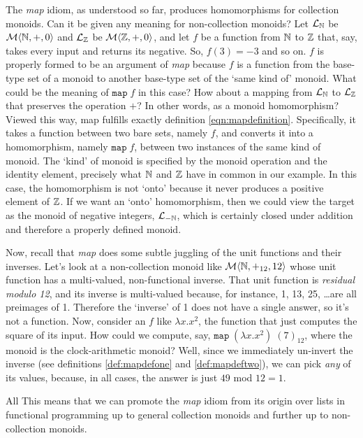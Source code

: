 The \emph{map} idiom, as understood so far, produces homomorphisms for collection monoids. Can it be given any meaning for non-collection monoids? Let $\mathcal{L}_{\mathbb{N}}$ be $\mathcal{M}\langle{\mathbb{N}},{+},{0}\rangle$ and $\mathcal{L}_{\mathbb{Z}}$ be $\mathcal{M}\langle{\mathbb{Z}},{+},{0}\rangle$, and let $f$ be a function from $\mathbb{N}$ to $\mathbb{Z}$ that, say, takes every input and returns its negative. So, $f(3)=-3$ and so on. $f$ is properly formed to be an argument of \emph{map} because $f$ is a function from the base-type set of a monoid to another base-type set of the `same kind of' monoid. What could be the meaning of $\mathtt{map}\;f$ in this case? How about a mapping from $\mathcal{L}_{\mathbb{N}}$ to $\mathcal{L}_{\mathbb{Z}}$ that preserves the operation $+$? In other words, as a monoid homomorphism? Viewed this way, map fulfills exactly definition \ref{eqn:mapdefinition}. Specifically, it takes a function between two bare sets, namely $f$, and converts it into a homomorphism, namely $\mathtt{map}\;f$, between two instances of the same kind of monoid. The `kind' of monoid is specified by the monoid operation and the identity element, precisely what $\mathbb{N}$ and $\mathbb{Z}$ have in common in our example. In this case, the homomorphism is not `onto' because it never produces a positive element of $\mathbb{Z}$. If we want an `onto' homomorphism, then we could view the target as the monoid of negative integers, $\mathcal{L}_{-\mathbb{N}}$, which is certainly closed under addition and therefore a properly defined monoid. 


Now, recall that \emph{map} does some subtle juggling of the unit functions and their inverses. Let's look at a non-collection monoid like $\mathcal{M}\langle{\mathbb{N}},{+_{12}},{12}\rangle$ whose unit function has a multi-valued, non-functional inverse. That unit function is \emph{residual modulo 12}, and its inverse is multi-valued because, for instance, 1, 13, 25, \ldots are all preimages of 1. Therefore the `inverse' of 1 does not have a single answer, so it's not a function. Now, consider an $f$ like $\lambda x.x^2$, the function that just computes the square of its input. How could we compute, say, $\mathtt{map}\;(\lambda x.x^2)\;(7)_{12}$, where the monoid is the clock-arithmetic monoid? Well, since we immediately un-invert the inverse (see definitions \ref{def:mapdefone} and \ref{def:mapdeftwo}), we can pick \emph{any} of its values, because, in all cases, the answer is just $49$ mod $12=1$. 


All This means that we can promote the \emph{map} idiom from its origin over lists in functional programming up to general collection monoids and further up to non-collection monoids. 


